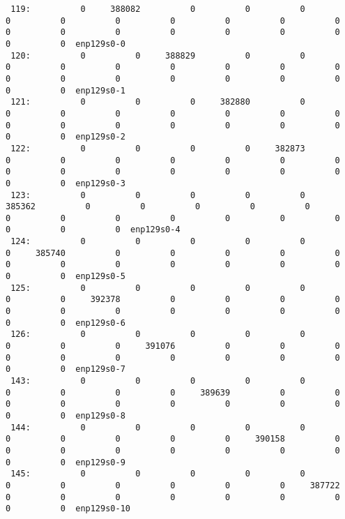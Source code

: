 \begin{lstlisting}
 119:          0     388082          0          0          0          0          0          0          0          0          0          0          0          0          0          0          0          0          0          0          0  enp129s0-0
 120:          0          0     388829          0          0          0          0          0          0          0          0          0          0          0          0          0          0          0          0          0          0  enp129s0-1
 121:          0          0          0     382880          0          0          0          0          0          0          0          0          0          0          0          0          0          0          0          0          0  enp129s0-2
 122:          0          0          0          0     382873          0          0          0          0          0          0          0          0          0          0          0          0          0          0          0          0  enp129s0-3
 123:          0          0          0          0          0     385362          0          0          0          0          0          0          0          0          0          0          0          0          0          0          0  enp129s0-4
 124:          0          0          0          0          0          0     385740          0          0          0          0          0          0          0          0          0          0          0          0          0          0  enp129s0-5
 125:          0          0          0          0          0          0          0     392378          0          0          0          0          0          0          0          0          0          0          0          0          0  enp129s0-6
 126:          0          0          0          0          0          0          0          0     391076          0          0          0          0          0          0          0          0          0          0          0          0  enp129s0-7
 143:          0          0          0          0          0          0          0          0          0     389639          0          0          0          0          0          0          0          0          0          0          0  enp129s0-8
 144:          0          0          0          0          0          0          0          0          0          0     390158          0          0          0          0          0          0          0          0          0          0  enp129s0-9
 145:          0          0          0          0          0          0          0          0          0          0          0     387722          0          0          0          0          0          0          0          0          0  enp129s0-10

\end{lstlisting}
